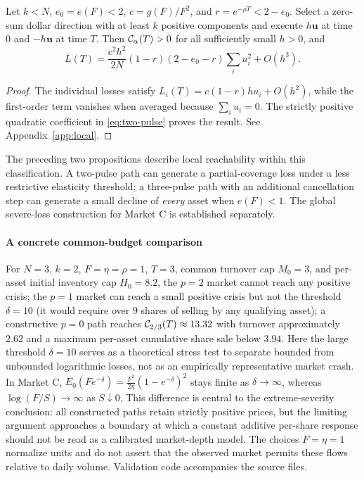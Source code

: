 \documentclass[review,hidelinks,onefignum,onetabnum]{siamonline250211}
\begin{document}
\begin{proposition}\label{prop:two-pulse}
Let $k<N$, $e_0=e(F)<2$, $c=g(F)/F^2$, and $r=e^{-\rho T}<2-e_0$. Select a zero-sum dollar direction with at least $k$ positive components and execute $h\bm u$ at time $0$ and $-h\bm u$ at time $T$. Then $\mathcal{C}_\alpha(T)>0$ for all sufficiently small $h>0$, and
\begin{equation}\label{eq:two-pulse}
\overline L(T)=\frac{c^2h^2}{2N}(1-r)(2-e_0-r)\sum_iu_i^2+O(h^3).
\end{equation}
\end{proposition}
\begin{proof}
The individual losses satisfy $L_i(T)=c(1-r)hu_i+O(h^2)$, while the first-order term vanishes when averaged because $\sum_i u_i=0$. The strictly positive quadratic coefficient in \eqref{eq:two-pulse} proves the result. See Appendix~\ref{app:local}.
\end{proof}

The preceding two propositions describe local reachability within this classification. A two-pulse path can generate a partial-coverage loss under a less restrictive elasticity threshold; a three-pulse path with an additional cancellation step can generate a small decline of \emph{every} asset when $e(F)<1$. The global severe-loss construction for Market C is established separately.

\paragraph{A concrete common-budget comparison} For $N=3$, $k=2$, $F=\eta=\rho=1$, $T=3$, common turnover cap $M_0=3$, and per-asset initial inventory cap $H_0=8.2$, the $p=2$ market cannot reach any positive crisis; the $p=1$ market can reach a small positive crisis but not the threshold $\delta=10$ (it would require over $9$ shares of selling by any qualifying asset); a constructive $p=0$ path reaches $\mathcal{C}_{2/3}(T)\approx13.32$ with turnover approximately $2.62$ and a maximum per-asset cumulative share sale below $3.94$. Here the large threshold $\delta=10$ serves as a theoretical stress test to separate bounded from unbounded logarithmic losses, not as an empirically representative market crash. In Market C, $E_0(Fe^{-\delta})=\frac{F^2}{2\eta}(1-e^{-\delta})^2$ stays finite as $\delta\to\infty$, whereas $\log(F/S)\to\infty$ as $S\downarrow0$. This difference is central to the extreme-severity conclusion: all constructed paths retain strictly positive prices, but the limiting argument approaches a boundary at which a constant additive per-share response should not be read as a calibrated market-depth model. The choices $F=\eta=1$ normalize units and do not assert that the observed market permits these flows relative to daily volume. Validation code accompanies the source files.
\end{document}
